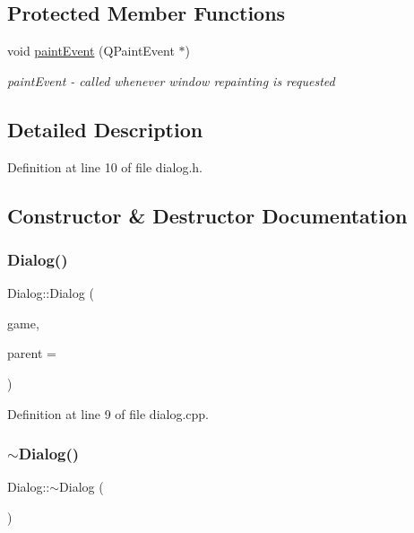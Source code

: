 \subsection*{Protected Member Functions}
\begin{DoxyCompactItemize}
\item 
void \mbox{\hyperlink{class_dialog_a93e4c843803f26bfe5746529cf163ec5}{paint\+Event}} (Q\+Paint\+Event $\ast$)
\begin{DoxyCompactList}\small\item\em paint\+Event -\/ called whenever window repainting is requested \end{DoxyCompactList}\end{DoxyCompactItemize}


\subsection{Detailed Description}


Definition at line 10 of file dialog.\+h.



\subsection{Constructor \& Destructor Documentation}
\mbox{\label{class_dialog_a50ae9716ee548a6f31fc5d0a29347899}} 
\subsubsection{\texorpdfstring{Dialog()}{Dialog()}}
{\footnotesize\ttfamily Dialog\+::\+Dialog (\begin{DoxyParamCaption}\item[{\mbox{\hyperlink{class_game}{Game}} $\ast$}]{game,  }\item[{Q\+Widget $\ast$}]{parent = {} }\end{DoxyParamCaption})\hspace{0.3cm}{\ttfamily [explicit]}}



Definition at line 9 of file dialog.\+cpp.

\mbox{\label{class_dialog_a2a1fe6ef28513eed13bfcd3a4da83ccb}} 
\subsubsection{\texorpdfstring{$\sim$\+Dialog()}{~Dialog()}}
{\footnotesize\ttfamily Dialog\+::$\sim$\+Dialog (\begin{DoxyParamCaption}{ }\end{DoxyParamCaption})}



